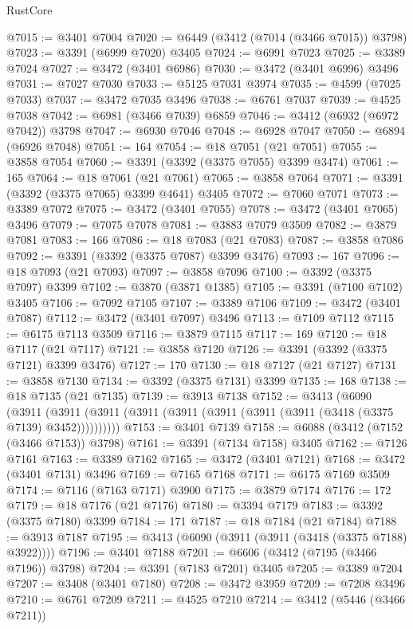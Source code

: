 \begin{lexlean}{RustCore}
\begin{coremodule}
@7015 := @3401 @7004
@7020 := @6449 (@3412 (@7014 (@3466 @7015)) @3798)
@7023 := @3391 (@6999 @7020) @3405
@7024 := @6991 @7023
@7025 := @3389 @7024
@7027 := @3472 (@3401 @6986)
@7030 := @3472 (@3401 @6996) @3496
@7031 := @7027 @7030
@7033 := @5125 @7031 @3974
@7035 := @4599 (@7025 @7033)
@7037 := @3472 @7035 @3496
@7038 := @6761 @7037
@7039 := @4525 @7038
@7042 := @6981 (@3466 @7039) @6859
@7046 := @3412 (@6932 (@6972 @7042)) @3798
@7047 := @6930 @7046
@7048 := @6928 @7047
@7050 := @6894 (@6926 @7048)
@7051 := 164
@7054 := @18 @7051 (@21 @7051)
@7055 := @3858 @7054
@7060 := @3391 (@3392 (@3375 @7055) @3399 @3474)
@7061 := 165
@7064 := @18 @7061 (@21 @7061)
@7065 := @3858 @7064
@7071 := @3391 (@3392 (@3375 @7065) @3399 @4641) @3405
@7072 := @7060 @7071
@7073 := @3389 @7072
@7075 := @3472 (@3401 @7055)
@7078 := @3472 (@3401 @7065) @3496
@7079 := @7075 @7078
@7081 := @3883 @7079 @3509
@7082 := @3879 @7081
@7083 := 166
@7086 := @18 @7083 (@21 @7083)
@7087 := @3858 @7086
@7092 := @3391 (@3392 (@3375 @7087) @3399 @3476)
@7093 := 167
@7096 := @18 @7093 (@21 @7093)
@7097 := @3858 @7096
@7100 := @3392 (@3375 @7097) @3399
@7102 := @3870 (@3871 @1385)
@7105 := @3391 (@7100 @7102) @3405
@7106 := @7092 @7105
@7107 := @3389 @7106
@7109 := @3472 (@3401 @7087)
@7112 := @3472 (@3401 @7097) @3496
@7113 := @7109 @7112
@7115 := @6175 @7113 @3509
@7116 := @3879 @7115
@7117 := 169
@7120 := @18 @7117 (@21 @7117)
@7121 := @3858 @7120
@7126 := @3391 (@3392 (@3375 @7121) @3399 @3476)
@7127 := 170
@7130 := @18 @7127 (@21 @7127)
@7131 := @3858 @7130
@7134 := @3392 (@3375 @7131) @3399
@7135 := 168
@7138 := @18 @7135 (@21 @7135)
@7139 := @3913 @7138
@7152 := @3413
    (@6090
      (@3911 (@3911 (@3911 (@3911 (@3911 (@3911 (@3911 (@3911 (@3418 (@3375 @7139) @3452))))))))))
@7153 := @3401 @7139
@7158 := @6088 (@3412 (@7152 (@3466 @7153)) @3798)
@7161 := @3391 (@7134 @7158) @3405
@7162 := @7126 @7161
@7163 := @3389 @7162
@7165 := @3472 (@3401 @7121)
@7168 := @3472 (@3401 @7131) @3496
@7169 := @7165 @7168
@7171 := @6175 @7169 @3509
@7174 := @7116 (@7163 @7171) @3900
@7175 := @3879 @7174
@7176 := 172
@7179 := @18 @7176 (@21 @7176)
@7180 := @3394 @7179
@7183 := @3392 (@3375 @7180) @3399
@7184 := 171
@7187 := @18 @7184 (@21 @7184)
@7188 := @3913 @7187
@7195 := @3413 (@6090 (@3911 (@3911 (@3418 (@3375 @7188) @3922))))
@7196 := @3401 @7188
@7201 := @6606 (@3412 (@7195 (@3466 @7196)) @3798)
@7204 := @3391 (@7183 @7201) @3405
@7205 := @3389 @7204
@7207 := @3408 (@3401 @7180)
@7208 := @3472 @3959
@7209 := @7208 @3496
@7210 := @6761 @7209
@7211 := @4525 @7210
@7214 := @3412 (@5446 (@3466 @7211))

\end{coremodule}
\end{lexlean}
